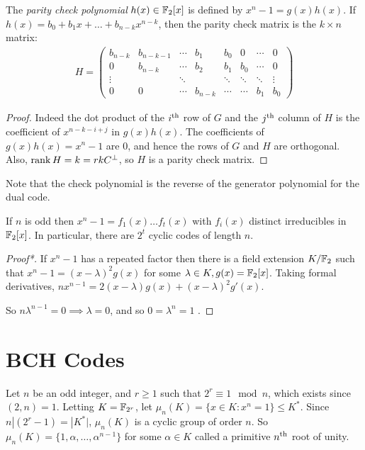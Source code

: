 \documentclass[10pt,a4paper]{article}
\begin{document}
\begin{lemma}
The \emph{parity check polynomial} $h(x) \in \mathbb{F}_2[x]$ is defined by $x^n-1 = g(x)h(x)$. If $h(x) = b_0 + b_1x + \ldots + b_{n-k}x^{n-k}$, then the parity check matrix is the $k \times n$ matrix:
\begin{align*}
H = \begin{pmatrix} b_{n-k} & b_{n-k-1} & \cdots & b_1 & b_0 & 0 & \cdots & 0 \\
0 & b_{n-k} & \cdots & b_2 & b_1 & b_0 & \cdots & 0 \\
\vdots & & \ddots & & \ddots  & \ddots & \ddots & \vdots \\
0 & 0 & \cdots & b_{n-k} & \cdots & \cdots & b_1 & b_0
\end{pmatrix}
\end{align*}
\end{lemma}
\begin{proof}
Indeed the dot product of the $i\textsuperscript{th}$ row of $G$ and the $j\textsuperscript{th}$ column of $H$ is the coefficient of $x^{n-k-i+j}$ in $g(x)h(x)$. The coefficients of $g(x)h(x) = x^n-1$ are 0, and hence the rows of $G$ and $H$ are orthogonal. Also, $\operatorname{rank} H = k = rkC^{\bot}$, so $H$ is a parity check matrix.
\end{proof}
Note that the check polynomial is the reverse of the generator polynomial for the dual code.
\begin{lemma}
If $n$ is odd then $x^n-1 = f_1(x) \ldots f_t(x)$ with $f_i(x)$ distinct irreducibles in $\mathbb{F}_2[x]$. In particular, there are $2^t$ cyclic codes of length $n$.
\end{lemma}
\begin{proof}[Proof*]
If $x^n-1$ has a repeated factor then there is a field extension $K/\mathbb{F}_2$ such that $x^n-1 = (x-\lambda)^2 g(x)$ for some $\lambda \in K, g(x) = \mathbb{F}_2[x]$. Taking formal derivatives, $nx^{n-1} = 2(x-\lambda)g(x) + (x-\lambda)^2 g'(x)$.

So $n\lambda^{n-1} = 0 \implies \lambda = 0$, and so $0 = \lambda^n = 1$ \contr.
\end{proof}

\section{BCH Codes}
Let $n$ be an odd integer, and $r \geq 1$ such that $2^r \equiv 1 \mod n$, which exists since $(2,n) = 1$. Letting $K = \mathbb{F}_{2^r}$, let $\mu_n(K) = \{x\in K:x^n = 1\}\leq K^{\ast}$. Since $n|(2^r-1) = |K^{\ast}|$, $\mu_n(K)$ is a cyclic group of order $n$. So $\mu_n(K) = \{1, \alpha, \ldots, \alpha^{n-1}\}$ for some $\alpha \in K$ called a primitive $n\textsuperscript{th}$ root of unity.
\end{document}
